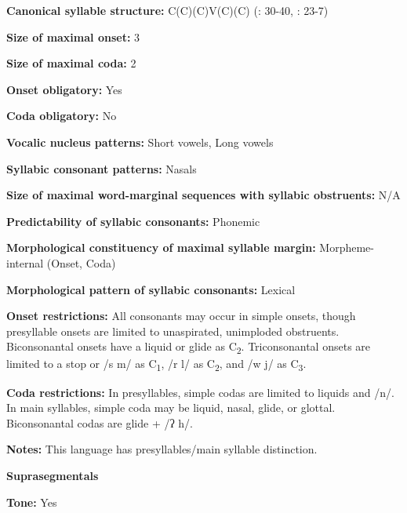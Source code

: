 \textbf{Canonical syllable structure:} C(C)(C)V(C)(C) (\citealt{Olsen2014}: 30-40, \citealt{Manley1972}: 23-7)



\textbf{Size of maximal onset:} 3



\textbf{Size of maximal coda:} 2



\textbf{Onset obligatory:} Yes



\textbf{Coda obligatory:} No



\textbf{Vocalic nucleus patterns:} Short vowels, Long vowels



\textbf{Syllabic consonant patterns:} Nasals



\textbf{Size of maximal word{}-marginal sequences with syllabic obstruents:} N/A



\textbf{Predictability of syllabic consonants:} Phonemic



\textbf{Morphological constituency of maximal syllable margin:} Morpheme-internal (Onset, Coda)



\textbf{Morphological pattern of syllabic consonants:} Lexical



\textbf{Onset restrictions:} All consonants may occur in simple onsets, though presyllable onsets are limited to unaspirated, unimploded obstruents. Biconsonantal onsets have a liquid or glide as C\textsubscript{2}. Triconsonantal onsets are limited to a stop or /s m/ as C\textsubscript{1}, /r l/ as C\textsubscript{2}, and /w j/ as C\textsubscript{3}.



\textbf{Coda restrictions:} In presyllables, simple codas are limited to liquids and /n/. In main syllables, simple coda may be liquid, nasal, glide, or glottal. Biconsonantal codas are glide + /ʔ h/.



\textbf{Notes:} This language has presyllables/main syllable distinction.



\textbf{Suprasegmentals}



\textbf{Tone:} Yes




